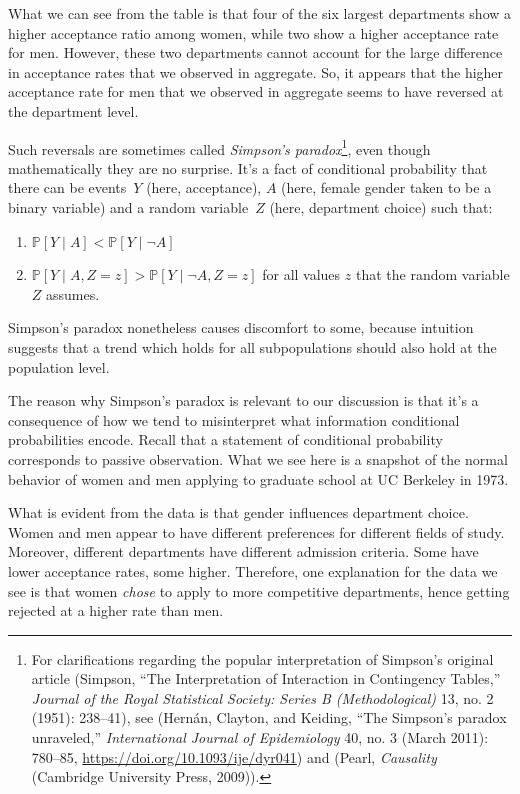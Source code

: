 \documentclass{tufte-book}
\begin{document}
What we can see from the table is that four of the six largest
departments show a higher acceptance ratio among women, while two show a
higher acceptance rate for men. However, these two departments cannot
account for the large difference in acceptance rates that we observed in
aggregate. So, it appears that the higher acceptance rate for men that
we observed in aggregate seems to have reversed at the department level.

Such reversals are sometimes called \emph{Simpson's paradox}\footnote{For
  clarifications regarding the popular interpretation of Simpson's
  original article (Simpson, {``The Interpretation of Interaction in
  Contingency Tables,''} \emph{Journal of the Royal Statistical Society:
  Series B (Methodological)} 13, no. 2 (1951): 238--41), see (Hernán,
  Clayton, and Keiding, {``{The Simpson's paradox unraveled},''}
  \emph{International Journal of Epidemiology} 40, no. 3 (March 2011):
  780--85, \url{https://doi.org/10.1093/ije/dyr041}) and (Pearl,
  \emph{Causality} (Cambridge University Press, 2009)).}, even though
mathematically they are no surprise. It's a fact of conditional
probability that there can be events~\(Y\) (here, acceptance), \(A\)
(here, female gender taken to be a binary variable) and a random
variable~\(Z\) (here, department choice) such that:

\begin{enumerate}
\def\labelenumi{\arabic{enumi}.}
\tightlist
\item
  \(\mathbb{P}[ Y \mid A ] < \mathbb{P}[ Y \mid \neg A ]\)
\item
  \(\mathbb{P}[ Y \mid A, Z = z ] > \mathbb{P}[ Y \mid \neg A, Z = z]\)
  for all values \(z\) that the random variable \(Z\) assumes.
\end{enumerate}

Simpson's paradox nonetheless causes discomfort to some, because
intuition suggests that a trend which holds for all subpopulations
should also hold at the population level.

The reason why Simpson's paradox is relevant to our discussion is that
it's a consequence of how we tend to misinterpret what information
conditional probabilities encode. Recall that a statement of conditional
probability corresponds to passive observation. What we see here is a
snapshot of the normal behavior of women and men applying to graduate
school at UC Berkeley in 1973.

What is evident from the data is that gender influences department
choice. Women and men appear to have different preferences for different
fields of study. Moreover, different departments have different
admission criteria. Some have lower acceptance rates, some higher.
Therefore, one explanation for the data we see is that women
\emph{chose} to apply to more competitive departments, hence getting
rejected at a higher rate than men.
\end{document}
